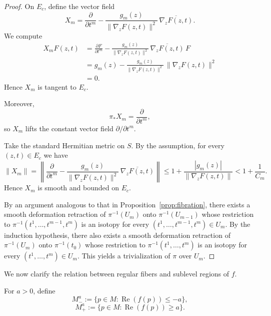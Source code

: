 \documentclass[11pt]{amsart}
\theoremstyle{plain}
\theoremstyle{definition}
\theoremstyle{remark}
\numberwithin{equation}{section}
\begin{document}
\begin{proof}
    On $E_c$, define the vector field
    \begin{equation}
        X_m = \frac{\partial}{\partial t^m} - \frac{g_m(z)}{\|\nabla_z F(z,t)\|^2}\, \overline{\nabla_z F(z,t)}.
    \end{equation}
    We compute
    \begin{equation}
        \begin{aligned}
            X_m F(z,t)
            &= \frac{\partial F}{\partial t^m} - \frac{g_m(z)}{\|\nabla_z F(z,t)\|^2}\, \overline{\nabla_z F(z,t)}\, F \\
            &= g_m(z) - \frac{g_m(z)}{\|\nabla_z F(z,t)\|^2}\, \|\nabla_z F(z,t)\|^2 \\
            &= 0.
        \end{aligned}
    \end{equation}
    Hence $X_m$ is tangent to $E_c$.

    Moreover,
    \begin{equation}
        \pi_* X_m = \frac{\partial}{\partial t^m},
    \end{equation}
    so $X_m$ lifts the constant vector field $\partial/\partial t^m$.

    Take the standard Hermitian metric on $S$.
    By the assumption, for every $(z,t) \in E_c$ we have
    \begin{equation}
        \|X_m\| = \left\| \frac{\partial}{\partial t^m} - \frac{g_m(z)}{\|\nabla_z F(z,t)\|^2}\, \overline{\nabla_z F(z,t)} \right\| \le 1 + \frac{|g_m(z)|}{\|\nabla_z F(z,t)\|} < 1 + \frac{1}{C_m}.
    \end{equation}
    Hence $X_m$ is smooth and bounded on $E_c$.

    By an argument analogous to that in Proposition~\ref{prop:fibration}, there exists a smooth deformation retraction of $\pi^{-1}(U_m)$ onto $\pi^{-1}(U_{m-1})$ whose restriction to $\pi^{-1}(t^1, \ldots, t^{m-1}, t^m)$ is an isotopy for every $(t^1, \ldots, t^{m-1}, t^m) \in U_m$.
    By the induction hypothesis, there also exists a smooth deformation retraction of $\pi^{-1}(U_m)$ onto $\pi^{-1}(t_0)$ whose restriction to $\pi^{-1}(t^1, \ldots, t^m)$ is an isotopy for every $(t^1, \ldots, t^m) \in U_m$.
    This yields a trivialization of $\pi$ over $U_m$.
\end{proof}

We now clarify the relation between regular fibers and sublevel regions of $f$.

For $a > 0$, define
\begin{equation}
    M_{-}^{a} := \{p \in M : \operatorname{Re}(f(p)) \le -a\},
\end{equation}
\begin{equation}
    M_{+}^{a} := \{p \in M : \operatorname{Re}(f(p)) \ge a\}.
\end{equation}
\end{document}
